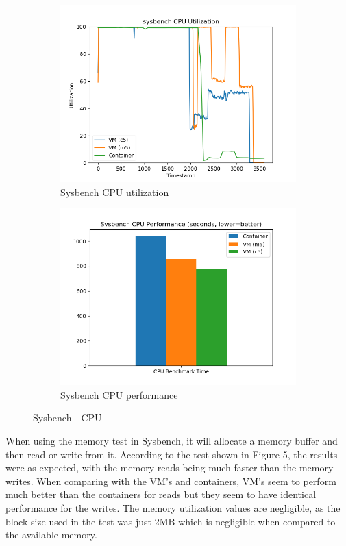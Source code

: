 \documentclass[11pt]{article}
\begin{document}
\begin{figure}[hbt!]
\centering
\begin{subfigure}{.5\textwidth}
  \centering
  \includegraphics[width=1.1\linewidth]{sysbench_cpu.png}
  \caption{Sysbench CPU utilization}
  \label{fig:sysb1}
\end{subfigure}%
\begin{subfigure}{.5\textwidth}
  \centering
  \includegraphics[width=1.1\linewidth]{sysbench_cpu_bar.png}
  \caption{Sysbench CPU performance}
  \label{fig:sysb2}
\end{subfigure}
\caption{Sysbench - CPU}
\label{fig:rubis}
\end{figure}

When using the memory test in Sysbench, it will allocate a memory buffer and then read or write from it. According to the test shown in Figure 5, the results were as expected, with the memory reads being much faster than the memory writes. When comparing with the VM's and containers, VM's seem to perform much better than the containers for reads but they seem to have identical performance for the writes. The memory utilization values are negligible, as the block size used in the test was just 2MB which is negligible when compared to the available memory. 
\end{document}

